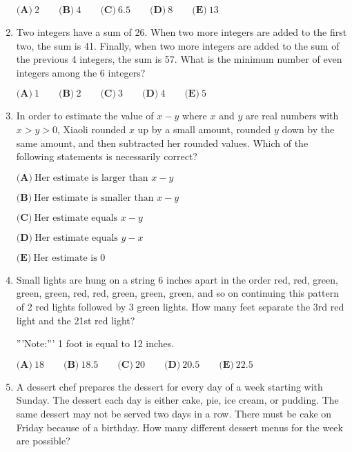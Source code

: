 \documentclass{article}
\begin{document}
\begin{enumerate}[label=\arabic*., itemsep=0.5em]
$\textbf{(A)}\ 2\qquad\textbf{(B)}\ 4\qquad\textbf{(C)}\ 6.5\qquad\textbf{(D)}\ 8\qquad\textbf{(E)}\ 13$\par \vspace{0.5em}\item Two integers have a sum of 26. When two more integers are added to the first two, the sum is 41. Finally, when two more integers are added to the sum of the previous 4 integers, the sum is 57. What is the minimum number of even integers among the 6 integers? 

$\textbf{(A)}\ 1\qquad\textbf{(B)}\ 2\qquad\textbf{(C)}\ 3\qquad\textbf{(D)}\ 4\qquad\textbf{(E)}\ 5$\par \vspace{0.5em}\item In order to estimate the value of $x-y$ where $x$ and $y$ are real numbers with $x > y > 0$, Xiaoli rounded $x$ up by a small amount, rounded $y$ down by the same amount, and then subtracted her rounded values. Which of the following statements is necessarily correct?

$\textbf{(A)}\ \text{Her estimate is larger than }x-y$

$\textbf{(B)}\ \text{Her estimate is smaller than }x-y$

$\textbf{(C)}\ \text{Her estimate equals }x-y$

$\textbf{(D)}\ \text{Her estimate equals }y - x$

$\textbf{(E)}\ \text{Her estimate is 0}$\par \vspace{0.5em}\item Small lights are hung on a string 6 inches apart in the order red, red, green, green, green, red, red, green, green, green, and so on continuing this pattern of 2 red lights followed by 3 green lights. How many feet separate the 3rd red light and the 21st red light?

'''Note:''' 1 foot is equal to 12 inches.

$\textbf{(A)}\ 18\qquad\textbf{(B)}\ 18.5\qquad\textbf{(C)}\ 20\qquad\textbf{(D)}\ 20.5\qquad\textbf{(E)}\ 22.5 $\par \vspace{0.5em}\item A dessert chef prepares the dessert for every day of a week starting with Sunday. The dessert each day is either cake, pie, ice cream, or pudding. The same dessert may not be served two days in a row. There must be cake on Friday because of a birthday. How many different dessert menus for the week are possible?


\end{enumerate}
\end{document}
